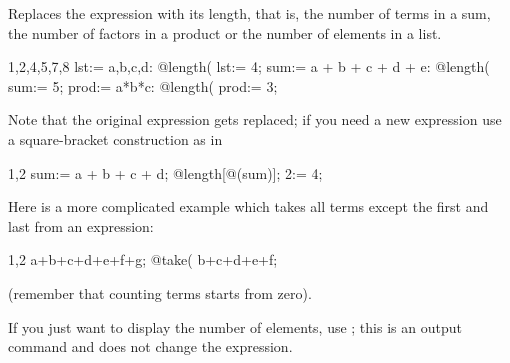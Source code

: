 
Replaces the expression with its length, that is, the number of terms
in a sum, the number of factors in a product or the number of
elements in a list.
\begin{screen}{1,2,4,5,7,8}
lst:= {a,b,c,d}:
@length(%
lst:= 4;
sum:= a + b + c + d + e:
@length(%
sum:= 5;
prod:= a*b*c:
@length(%
prod:= 3;
\end{screen}
Note that the original expression gets replaced; if you need a new
expression use a square-bracket construction as in
\begin{screen}{1,2}
sum:= a + b + c + d;
@length[@(sum)];
2:= 4;
\end{screen}

Here is a more complicated example which takes all terms except the
first and last from an expression:
\begin{screen}{1,2}
a+b+c+d+e+f+g;
@take(%
b+c+d+e+f;
\end{screen}
(remember that counting terms starts from zero).

If you just want to display the number of elements, use
; this is an output command and does
not change the expression.

